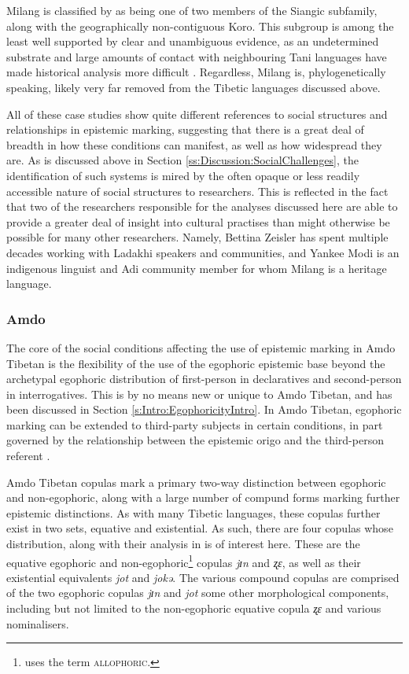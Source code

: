 Milang is classified by  as being one of two members of the Siangic subfamily, along with the geographically non-contiguous Koro. This subgroup is among the least well supported by clear and unambiguous evidence, as an undetermined substrate and large amounts of contact with neighbouring Tani languages have made historical analysis more difficult \cite{Modi2017}. Regardless, Milang is, phylogenetically speaking, likely very far removed from the Tibetic languages discussed above.

All of these case studies show quite different references to social structures and relationships in epistemic marking, suggesting that there is a great deal of breadth in how these conditions can manifest, as well as how widespread they are. As is discussed above in Section \ref{ss:Discussion:SocialChallenges}, the identification of such systems is mired by the often opaque or less readily accessible nature of social structures to researchers. This is reflected in the fact that two of the researchers responsible for the analyses discussed here are able to provide a greater deal of insight into cultural practises than might otherwise be possible for many other researchers. Namely, Bettina Zeisler has spent multiple decades working with Ladakhi speakers and communities, and Yankee Modi is an indigenous linguist and Adi community member for whom Milang is a heritage language.

\subsubsection{Amdo}\label{sss:Discussion:AmdoCase}
The core of the social conditions affecting the use of epistemic marking in Amdo Tibetan is the flexibility of the use of the egophoric epistemic base beyond the archetypal egophoric distribution of first-person in declaratives and second-person in interrogatives. This is by no means new or unique to Amdo Tibetan, and has been discussed in Section \ref{s:Intro:EgophoricityIntro}. In Amdo Tibetan, egophoric marking can be extended to third-party subjects in certain conditions, in part governed by the relationship between the epistemic origo and the third-person referent \cite{Tribur2019}.

Amdo Tibetan copulas mark a primary two-way distinction between egophoric and non-egophoric, along with a large number of compund forms marking further epistemic distinctions. As with many Tibetic languages, these copulas further exist in two sets, equative and existential. As such, there are four copulas whose distribution, along with their analysis in  is of interest here. These are the equative egophoric and non-egophoric\footnote{ uses the term \textsc{allophoric}.} copulas \textit{jɪn} and \textit{ʐɛ}, as well as their existential equivalents \textit{jot} and \textit{jokə}. The various compound copulas are comprised of the two egophoric copulas \textit{jɪn} and \textit{jot} some other morphological components, including but not limited to the non-egophoric equative copula \textit{ʐɛ} and various nominalisers.

